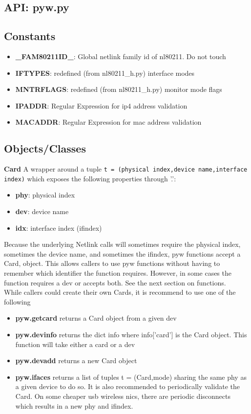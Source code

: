 \documentclass[11pt]{article}
\begin{document}
\begin{appendices}
\section{API: pyw.py}\label{sec:pywapi}

\subsection{Constants}
\begin{itemize}
\item \textbf{\_FAM80211ID\_}: Global netlink family id of nl80211. Do not touch
\item \textbf{IFTYPES}: redefined (from nl80211\_h.py) interface modes
\item \textbf{MNTRFLAGS}: redefined (from nl80211\_h.py) monitor mode flags
\item \textbf{IPADDR}: Regular Expression for ip4 address validation
\item \textbf{MACADDR}: Regular Expression for mac address validation
\end{itemize}

\subsection{Objects/Classes}
\textbf{Card} A wrapper around a tuple 
\texttt{t = (physical index,device name,interface index)}
which exposes the following properties through '.':
\begin{itemize}
\item \textbf{phy}: physical index
\item \textbf{dev}: device name
\item \textbf{idx}: interface index (ifindex)
\end{itemize}
Because the underlying Netlink calls will sometimes require the physical index,
sometimes the device name, and sometimes the ifindex, pyw functions accept a Card,
object. This allows callers to use pyw functions without having to remember which 
identifier the function requires. However, in some cases the function requires 
a dev or accepts both. See the next section on functions.\\

While callers could create their own Cards, it is recommend to use one of the 
following
\begin{itemize}
\item \textbf{pyw.getcard} returns a Card object from a given dev
\item \textbf{pyw.devinfo} returns the dict info where info['card'] is the Card 
object. This function will take either a card or a dev
\item \textbf{pyw.devadd} returns a new Card object
\item \textbf{pyw.ifaces} returns a list of tuples t = (Card,mode) sharing the 
same phy as a given device to do so. It is also recommended to periodically 
validate the Card. On some cheaper usb wireless nics, there are periodic 
disconnects which results in a new phy and ifindex.
\end{itemize}


\end{appendices}
\end{document}

